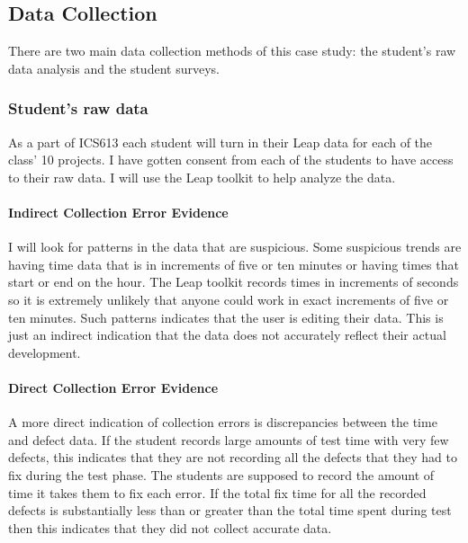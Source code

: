 \subsection{Data Collection}

There are two main data collection methods of this case study: the student's
raw data analysis and the student surveys.

\subsubsection{Student's raw data}

As a part of ICS613 each student will turn in their Leap data for each of the
class' 10 projects. I have gotten consent from each of the students to have
access to their raw data.  I will use the Leap toolkit to help analyze the data.

\paragraph{Indirect Collection Error Evidence}

I will look for patterns in the data that are suspicious.  Some suspicious
trends are having time data that is in increments of five or ten minutes or
having times that start or end on the hour.  The Leap toolkit records times in
increments of seconds so it is extremely unlikely that anyone could work in
exact increments of five or ten minutes.  Such patterns indicates that the user
is editing their data.  This is just an indirect indication that the data does
not accurately reflect their actual development.

\paragraph{Direct Collection Error Evidence}

A more direct indication of collection errors is discrepancies between the time
and defect data.  If the student records large amounts of test time with very
few defects, this indicates that they are not recording all the defects that
they had to fix during the test phase.  The students are supposed to record the 
amount of time it takes them to fix each error.  If the total fix time for all
the recorded defects is substantially less than or greater than the total time
spent during test then this indicates that they did not collect accurate data.

